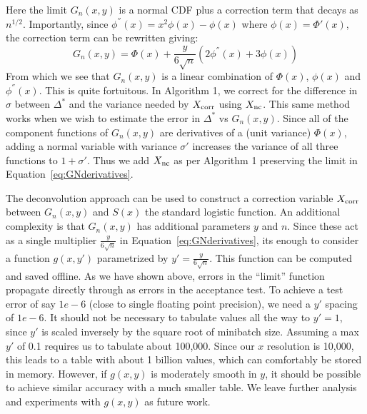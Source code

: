 \documentclass{article}
\begin{document}
Here the limit $G_n(x,y)$ is a normal CDF plus a correction term that decays as
$n^{1/2}$.
Importantly, since $\phi^{''}(x) = x^2\phi(x) - \phi(x)$ where
$\phi(x)=\Phi'(x)$, the correction term can be rewritten giving:
\begin{equation}\label{eq:GNderivatives}
    G_n(x,y) = \Phi(x) + \frac{y}{6\sqrt{n}}(2\phi^{''}(x)+3\phi(x))
\end{equation}
From which we see that $G_n(x,y)$ is a linear combination of $\Phi(x)$,
$\phi(x)$ and $\phi^{''}(x)$. This is quite fortuitous. In Algorithm 1, we
correct for the difference in $\sigma$ between $\Delta^*$ and the variance
needed by $X_{\rm corr}$ using $X_{\rm nc}$. This same method works when we
wish to estimate the error in $\Delta^*$ vs $G_n(x,y)$. Since all of the
component functions of $G_n(x,y)$ are derivatives of a (unit variance)
$\Phi(x)$, adding a normal variable with variance $\sigma'$ increases the
variance of all three functions to $1+\sigma'$. Thus we add $X_{\rm nc}$ as
per Algorithm 1 preserving the limit in Equation~\ref{eq:GNderivatives}.

The deconvolution approach can be used to construct a correction variable
$X_{\rm corr}$ between $G_n(x,y)$ and $S(x)$ the standard logistic function. An
additional complexity is that $G_n(x,y)$ has additional parameters $y$ and $n$.
Since these act as a single multiplier $\frac{y}{6\sqrt{n}}$ in
Equation~\ref{eq:GNderivatives}, its enough to consider a function $g(x,y')$
parametrized by $y'= \frac{y}{6\sqrt{n}}$. This function can be computed and
saved offline. As we have shown above, errors in the ``limit'' function
propagate directly through as errors in the acceptance test.  To achieve a test
error of say $1e-6$ (close to single floating point precision), we need a $y'$
spacing of $1e-6$. It should not be necessary to tabulate values all the way to
$y'=1$, since $y'$ is scaled inversely by the square root of minibatch size.
Assuming a max $y'$ of 0.1 requires us to tabulate about 100,000.  Since our $x$
resolution is 10,000, this leads to a table with about 1 billion values, which
can comfortably be stored in memory.  However, if $g(x,y)$ is moderately smooth
in $y$, it should be possible to achieve similar accuracy with a much smaller
table. We leave further analysis and experiments with $g(x,y)$ as future work.
\end{document}
